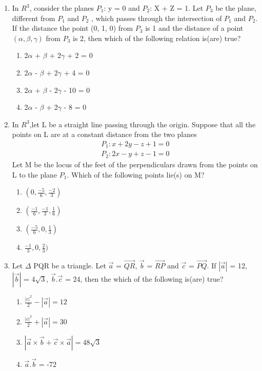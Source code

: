 \begin{enumerate}[label=\arabic*.,ref=\thesubsection.\theenumi]
\item In $R^{3}$, consider the planes $P_1$: y = 0 and $P_2$: X + Z = 1. Let $P_3$ be the plane, different from $P_1$ and $P_2$ , which passes through the intersection of $P_1$ and $P_2$. If the distance the point (0, 1, 0) from $P_3$ is 1 and the distance of a point $(\alpha, \beta, \gamma)$ from $P_3$ is 2, then which of the following relation is(are) true?
\begin{enumerate}
\item 2$\alpha$ + $\beta$ + 2$\gamma$ + 2 = 0
\item 2$\alpha$ - $\beta$ + 2$\gamma$ + 4 = 0
\item 2$\alpha$ + $\beta$ - 2$\gamma$ - 10 = 0
\item 2$\alpha$ - $\beta$ + 2$\gamma$ - 8 = 0
\end{enumerate} 

\item In $R^{3}$,let L be a straight line passing through the origin. Suppose that all the points on L are at a constant distance from the two planes 
\begin{align*}
P_1: x + 2y - z + 1 = 0
\end{align*}
\begin{align*}
P_2: 2x - y + z - 1 = 0
\end{align*}
Let M be the locus of the feet of the perpendiculars drawn from the points on L to the plane $P_1$. Which of the following points lie(s) on M?
\begin{enumerate}
\item $(0, \frac{-5}{6}, \frac{-2}{3})$
\item $(\frac{-1}{6}, \frac{-1}{3}, \frac{1}{6})$
\item $(\frac{-5}{6}, 0, \frac{1}{3})$
\item $\frac{-1}{3}, 0, \frac{2}{3})$
\end{enumerate}

\item Let $\Delta$ PQR be a triangle. Let $\overrightarrow{a}$ = $\overrightarrow{QR}$, $\overrightarrow{b}$ = 
$\overrightarrow{RP}$ and $\overrightarrow{c}$ = $\overrightarrow{PQ}$. If $|\overrightarrow{a}|$ = 12, 
$|\overrightarrow{b}|$ = 4$\sqrt{3}$, $\overrightarrow{b}.\overrightarrow{c}$ = 24, then the which of the following is(are) true?
\begin{enumerate}
\item $\frac{|c|^{2}}{2} - |\overrightarrow{a}| = 12$
\item $\frac{|c|^{2}}{2} + |\overrightarrow{a}| = 30$
\item $|\overrightarrow{a} \times \overrightarrow{b} + \overrightarrow{c} \times \overrightarrow{a}| = 48\sqrt{3}$
\item $\overrightarrow{a}$.$\overrightarrow{b}$ = -72
\end{enumerate}


\end{enumerate}
